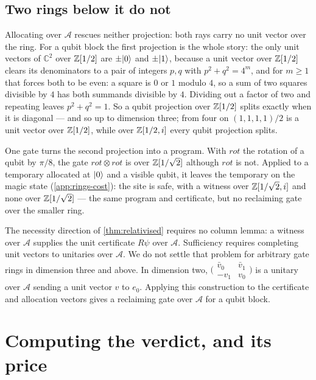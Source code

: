 \documentclass[acmsmall,screen,review,anonymous,nonacm]{acmart}
\begin{document}
\subsection{Two rings below it do not}\label{sec:realrings}

\stmtRings

Allocating over $\mathcal A$ rescues neither projection: both rays carry
no unit vector over the ring.
For a qubit block the first projection is the whole story: the only
unit vectors of $\mathbb C^{2}$ over $\mathbb{Z}[1/2]$ are $\pm\lvert 0 \rangle$ and
$\pm\lvert 1 \rangle$, because a unit vector over $\mathbb{Z}[1/2]$ clears its denominators to a pair of
integers $p, q$ with $p^{2} + q^{2} = 4^{m}$, and for $m \ge 1$ that forces
both to be even: a square is $0$ or $1$ modulo $4$, so a sum of two squares
divisible by $4$ has both summands divisible by $4$. Dividing out a factor of
two and repeating leaves $p^{2}+q^{2}=1$. So a qubit projection over
$\mathbb{Z}[1/2]$ splits exactly when it is diagonal --- and so up to dimension three; from four on
$(1,1,1,1)/2$ is a unit vector over $\mathbb{Z}[1/2]$, while over $\mathbb{Z}[1/2, i]$ every qubit projection splits.

One gate turns the second projection into a program. With $\mathit{rot}$ the
rotation of a qubit by $\pi/8$, the gate $\mathit{rot} \otimes \mathit{rot}$
is over $\mathbb{Z}[1/\sqrt2]$ although $\mathit{rot}$ is not. Applied to a
temporary allocated at $\lvert 0 \rangle$ and a visible qubit, it leaves the temporary
on the magic state (\cref{app:rings-cost}): the site is safe, with a
witness over $\mathbb{Z}[1/\sqrt2, i]$ and none over $\mathbb{Z}[1/\sqrt2]$ --- the same
program and certificate, but no reclaiming gate over the smaller ring.

The necessity direction of \cref{thm:relativised} requires no column lemma:
a witness over $\mathcal A$ supplies the unit certificate $R\psi$ over
$\mathcal A$. Sufficiency requires completing unit vectors to unitaries
over $\mathcal A$. We do not settle that problem for arbitrary gate rings
in dimension three and above. In dimension two,
$\bigl(\begin{smallmatrix}\bar v_0 & \bar v_1\\ -v_1 & v_0\end{smallmatrix}\bigr)$
is a unitary over $\mathcal A$ sending a unit vector $v$ to $e_0$.
Applying this construction to the certificate and allocation vectors gives
a reclaiming gate over $\mathcal A$ for a qubit block.

\section{Computing the verdict, and its price}\label{sec:cost}
\end{document}
